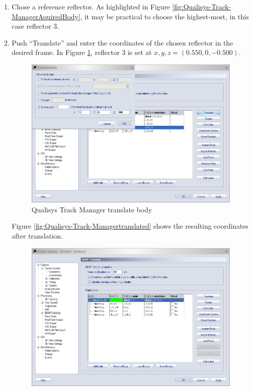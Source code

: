 \documentclass[a4paper,english]{report}
\begin{document}
\begin{enumerate}
	\begin{enumerate}
		\item Chose a reference reflector. As highlighted in Figure \ref{fig:Qualisys-Track-ManagerAquiredBody}, it may be practical to choose the highest-most, in this case reflector 3.
		\item Push ``Translate'' and enter the coordinates of the chosen reflector in the desired frame. In Figure \ref{fig:Qualisys-Track-Managertranslate}, reflector 3 is set at $x,y,z=\left(0.550,0,-0.500\right)$. 
		\begin{figure}[!h]
			\centering \includegraphics[width=1\textwidth]{fig/qualisys_orientating2}
			\caption{\label{fig:Qualisys-Track-Managertranslate}Qualisys Track Manager
				translate body}
		\end{figure}
		Figure \ref{fig:Qualisys-Track-Managertranslated} shows the resulting coordinates after translation.
		\begin{figure}[!h]
			\centering \includegraphics[width=1\textwidth]{fig/qualisys_orientating3}

\end{figure}
\end{enumerate}
\end{enumerate}
\end{document}

